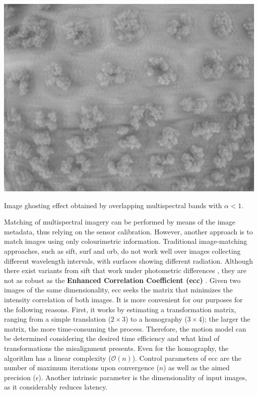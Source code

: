 \begin{marginfigure}[.2cm]
  \includegraphics{figs/image_fusion/multispectral_ghost_effect.png}
  \caption{Image ghosting effect obtained by overlapping multispectral bands with $\alpha < 1$.}
  \label{fig:multispectral_ghost_effect}
\end{marginfigure}
Matching of multispectral imagery can be performed by means of the image metadata, thus relying on the sensor calibration. However, another approach is to match images using only colourimetric information. Traditional image-matching approaches, such as \acrshort{sift}, \acrshort{surf} and \acrshort{orb}, do not work well over images collecting different wavelength intervals, with surfaces showing different radiation. Although there exist variants from \acrshort{sift} that work under photometric differences \cite{park_pi-sift_2008}, they are not as robust as the \textbf{Enhanced Correlation Coefficient (\acrshort{ecc})} \cite{evangelidis_parametric_2008}. Given two images of the same dimensionality, \acrshort{ecc} seeks the matrix that minimizes the intensity correlation of both images. It is more convenient for our purposes for the following reasons. First, it works by estimating a transformation matrix, ranging from a simple translation ($2 \times 3$) to a homography ($3 \times 4$); the larger the matrix, the more time-consuming the process. Therefore, the motion model can be determined considering the desired time efficiency and what kind of transformations the misalignment presents. Even for the homography, the algorithm has a linear complexity ($\mathcal{O}(n)$). Control parameters of \acrshort{ecc} are the number of maximum iterations upon convergence ($n$) as well as the aimed precision ($\epsilon$). Another intrinsic parameter is the dimensionality of input images, as it considerably reduces latency.

